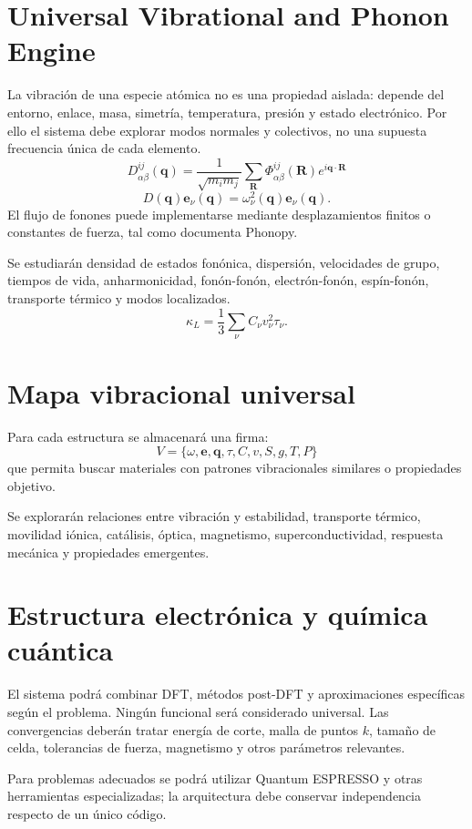 \documentclass[11pt,a4paper]{article}
\begin{document}
\section{Universal Vibrational and Phonon Engine}
La vibración de una especie atómica no es una propiedad aislada: depende del entorno, enlace, masa, simetría, temperatura, presión y estado electrónico. Por ello el sistema debe explorar modos normales y colectivos, no una supuesta frecuencia única de cada elemento.
\[
D_{\alpha\beta}^{ij}(\mathbf q)=\frac{1}{\sqrt{m_im_j}}\sum_{\mathbf R}\Phi_{\alpha\beta}^{ij}(\mathbf R)e^{i\mathbf q\cdot\mathbf R}
\]
\[
D(\mathbf q)\mathbf e_\nu(\mathbf q)=\omega_\nu^2(\mathbf q)\mathbf e_\nu(\mathbf q).
\]
El flujo de fonones puede implementarse mediante desplazamientos finitos o constantes de fuerza, tal como documenta Phonopy. \cite{phonopy}

Se estudiarán densidad de estados fonónica, dispersión, velocidades de grupo, tiempos de vida, anharmonicidad, fonón-fonón, electrón-fonón, espín-fonón, transporte térmico y modos localizados.
\[
\kappa_L=\frac13\sum_\nu C_\nu v_\nu^2\tau_\nu.
\]

\section{Mapa vibracional universal}
Para cada estructura se almacenará una firma:
\[
V=\{\omega,\mathbf e,\mathbf q,\tau,C,v,S,g,T,P\}
\]
que permita buscar materiales con patrones vibracionales similares o propiedades objetivo.

Se explorarán relaciones entre vibración y estabilidad, transporte térmico, movilidad iónica, catálisis, óptica, magnetismo, superconductividad, respuesta mecánica y propiedades emergentes.

\section{Estructura electrónica y química cuántica}
El sistema podrá combinar DFT, métodos post-DFT y aproximaciones específicas según el problema. Ningún funcional será considerado universal. Las convergencias deberán tratar energía de corte, malla de puntos $k$, tamaño de celda, tolerancias de fuerza, magnetismo y otros parámetros relevantes.

Para problemas adecuados se podrá utilizar Quantum ESPRESSO y otras herramientas especializadas; la arquitectura debe conservar independencia respecto de un único código. \cite{qe}
\end{document}
